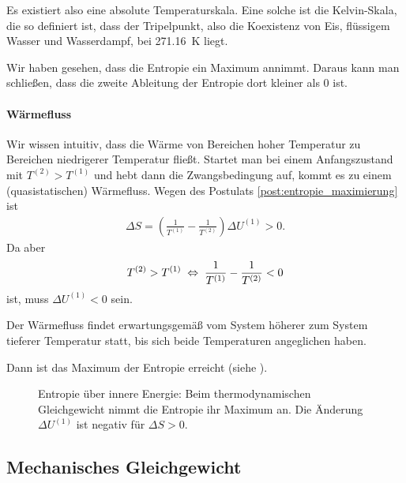 \begin{formal}
    Es existiert also eine absolute Temperaturskala. Eine solche ist die Kelvin-Skala, die so definiert ist, dass der Tripelpunkt, also die Koexistenz von Eis, flüssigem Wasser und Wasserdampf, bei \SI{271,16}{\kelvin} liegt.
\end{formal}

Wir haben gesehen, dass die Entropie ein Maximum annimmt. Daraus kann man schließen, dass die zweite Ableitung der Entropie dort kleiner als $0$ ist.

\paragraph*{Wärmefluss}

Wir wissen intuitiv, dass die Wärme von Bereichen hoher Temperatur zu Bereichen niedrigerer Temperatur fließt. Startet man bei einem Anfangszustand mit $T^{(2)}> T^{(1)}$ und hebt dann die Zwangsbedingung auf, kommt es zu einem (quasistatischen) Wärmefluss.
Wegen des Postulats \ref{post:entropie_maximierung} ist
\begin{align*}
    \Delta S= \left(\frac{1}{T^{(1)}}-\frac{1}{T^{(2)}}\right)\Delta U^{(1)} > 0.
\end{align*}
Da aber
\begin{align*}
    T^{(2)}> T^{(1)} \;\Leftrightarrow\; \frac{1}{T^{(1)}}-\frac{1}{T^{(2)}} < 0
\end{align*}
ist, muss $\Delta U^{(1)} <0$ sein.
\begin{formal}
    Der Wärmefluss findet erwartungsgemäß vom System höherer zum System tieferer Temperatur statt, bis sich beide Temperaturen angeglichen haben.
\end{formal}
Dann ist das Maximum der Entropie erreicht (siehe ).

\begin{figure}[htbp]
    \centering
    \tfigFunktionEntropieMaximum
    \caption{Entropie über innere Energie: Beim thermodynamischen Gleichgewicht nimmt die Entropie ihr Maximum an. Die Änderung $\Delta U^{(1)}$ ist negativ für $\Delta S>0$. }
    \label{fig:FunktionEntropieMaximum}
\end{figure}




\subsection{Mechanisches Gleichgewicht}


